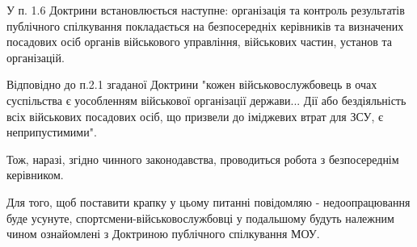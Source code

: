 У п. 1.6 Доктрини встановлюється наступне: організація та контроль результатів
публічного спілкування  покладається на безпосередніх керівників  та визначених
посадових осіб органів військового управління, військових частин, установ та
організацій.

Відповідно до п.2.1 згаданої Доктрини "кожен військовослужбовець в очах
суспільства є уособленням військової організації держави... Дії або
бездіяльність всіх військових посадових осіб, що призвели до іміджевих втрат
для ЗСУ, є неприпустимими". 

Тож,  наразі, згідно чинного законодавства, проводиться робота з безпосереднім
керівником. 

Для того, щоб поставити крапку у цьому питанні повідомляю - недоопрацювання
буде усунуте,  спортсмени-військовослужбовці  у подальшому будуть належним
чином ознайомлені з Доктриною публічного спілкування МОУ.

